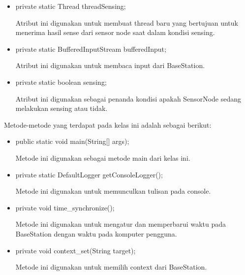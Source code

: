 \begin{itemize}
    \item private static Thread threadSensing;
    
    Atribut ini digunakan untuk membuat thread baru yang bertujuan untuk menerima hasil sense dari sensor node saat dalam kondisi sensing.
    
    \item private static BufferedInputStream bufferedInput;
    
    Atribut ini digunakan untuk membaca input dari BaseStation.
    
    \item private static boolean sensing;
    
    Atribut ini digunakan sebagai penanda kondisi apakah SensorNode sedang melakukan sensing atau tidak.
    
\end{itemize}

Metode-metode yang terdapat pada kelas ini adalah sebagai berikut:

\begin{itemize}
    \item public static void main(String[] args);
    
    Metode ini digunakan sebagai metode main dari kelas ini.
    
    \item private static DefaultLogger getConsoleLogger();
    
    Metode ini digunakan untuk memunculkan tulisan pada console.
    
    \item private void time\_synchronize();
    
    Metode ini digunakan untuk mengatur dan memperbarui waktu pada BaseStation dengan waktu pada komputer pengguna.
    
    \item private void context\_set(String target);
    
    Metode ini digunakan untuk memilih context dari BaseStation.
\end{itemize}

